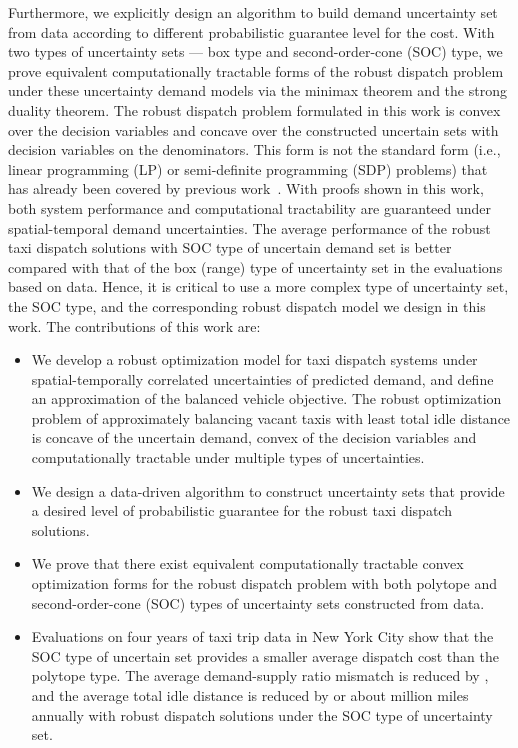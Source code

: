 \documentclass[10pt,twocolumn,twoside,english]{IEEEtran}
\begin{document}
Furthermore, we explicitly design an algorithm to build demand uncertainty set from data according to different probabilistic guarantee level for the cost. With two types of uncertainty sets --- box type and second-order-cone (SOC) type, we prove equivalent computationally tractable forms of the robust dispatch problem under these uncertainty demand models via the minimax theorem and the strong duality theorem. The robust dispatch problem formulated in this work is convex over the decision variables and concave over the constructed uncertain sets with decision variables on the denominators. This form is not the standard form (i.e., linear programming (LP) or semi-definite programming (SDP) problems) that has already been covered by previous work~\cite{robustconvex, datad_robust, robust_mpc}. With proofs shown in this work, both system performance and computational tractability are guaranteed under spatial-temporal demand uncertainties. The average performance of the robust taxi dispatch solutions with SOC type of uncertain demand set is better compared with that of the box (range) type of uncertainty set in the evaluations based on data. Hence, it is critical to use a more complex type of uncertainty set, the SOC type, and the corresponding robust dispatch model we design in this work. The contributions of this work are:
\begin{itemize}
\item We develop a robust optimization model for taxi dispatch systems under spatial-temporally correlated uncertainties of predicted demand, and define an approximation of the balanced vehicle objective. The robust optimization problem of approximately balancing vacant taxis with least total idle distance is concave of the uncertain demand, convex of the decision variables and computationally tractable under multiple types of uncertainties. 
\item We design a data-driven algorithm to construct uncertainty sets that provide a desired level of probabilistic guarantee for the robust taxi dispatch solutions. 
\item We prove that there exist equivalent computationally tractable convex optimization forms for the robust dispatch problem with both polytope and second-order-cone (SOC) types of  uncertainty sets constructed from data.
\item  Evaluations on four years of taxi trip data in New York City show that the SOC type of uncertain set provides a smaller average dispatch cost than the polytope type. The average demand-supply ratio mismatch is reduced by , and the average total idle distance is reduced by  or about  million miles annually with robust dispatch solutions under the SOC type of uncertainty set.
\end{itemize}
\end{document}
